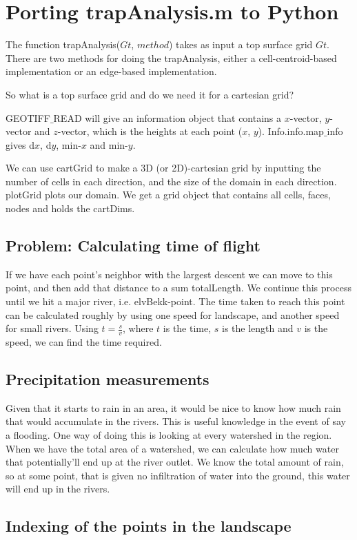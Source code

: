 \documentclass[10pt,a4paper]{article}
\begin{document}
\section*{Porting trapAnalysis.m to Python}
The function trapAnalysis($Gt$, $method$) takes as input a top surface grid $Gt$. There are two methods for doing the trapAnalysis, either a cell-centroid-based implementation or an edge-based implementation.

So what is a top surface grid and do we need it for a cartesian grid?

GEOTIFF$\_$READ will give an information object that contains a $x$-vector, $y$-vector and $z$-vector, which is the heights at each point ($x$, $y$). Info.info.map$\_$info gives d$x$, d$y$, min-$x$ and min-$y$. 

We can use cartGrid to make a 3D (or 2D)-cartesian grid by inputting the number of cells in each direction, and the size of the domain in each direction. plotGrid plots our domain. We get a grid object that contains all cells, faces, nodes and holds the cartDims.


\subsection{Problem: Calculating time of flight}
If we have each point's neighbor with the largest descent we can move to this point, and then add that distance to a sum totalLength. We continue this process until we hit a major river, i.e. elvBekk-point. The time taken to reach this point can be calculated roughly by using one speed for landscape, and another speed for small rivers. Using $t = \frac{s}{v}$, where $t$ is the time, $s$ is the length and $v$ is the speed, we can find the time required.

\subsection{Precipitation measurements}
Given that it starts to rain in an area, it would be nice to know how much rain that would accumulate in the rivers. This is useful knowledge in the event of say a flooding. One way of doing this is looking at every watershed in the region. When we have the total area of a watershed, we can calculate how much water that potentially'll end up at the river outlet. We know the total amount of rain, so at some point, that is given no infiltration of water into the ground, this water will end up in the rivers.  

\subsection{Indexing of the points in the landscape}
						
\end{document}
